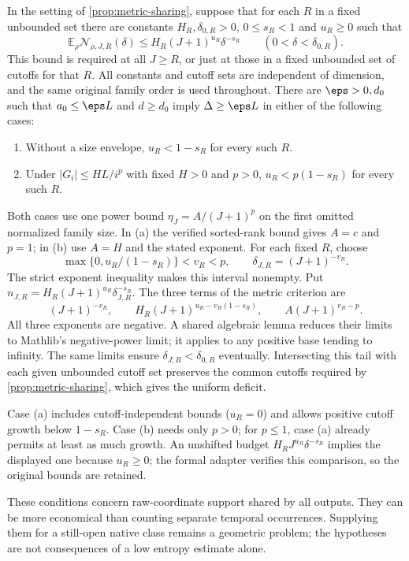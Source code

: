 \begin{corollary}\label{cor:covering-exponents}
In the setting of \cref{prop:metric-sharing}, suppose that for each $R$
in a fixed unbounded set there are constants $H_R,\delta_{0,R}>0$,
$0\le s_R<1$ and $u_R\ge0$ such that
\[
 \mathbb E_\rho\mathcal N_{\rho,J,R}(\delta)
 \le H_R(J+1)^{u_R}\delta^{-s_R}
 \qquad(0<\delta<\delta_{0,R}).
\]
This bound is required at all $J\ge R$, or just at those in a fixed
unbounded set of cutoffs for that $R$. All constants and cutoff sets
are independent of dimension, and the same original family order is
used throughout. There are $\eps>0,d_0$ such that $a_0\le\eps L$ and
$d\ge d_0$ imply $\Delta\ge\eps L$ in either of the following cases:
\begin{enumerate}[label=(\alph*)]
\item Without a size envelope, $u_R<1-s_R$ for every such $R$.
\item Under $|G_i|\le HL/i^p$ with fixed $H>0$ and $p>0$,
$u_R<p(1-s_R)$ for every such $R$.
\end{enumerate}
\end{corollary}
\begin{outline}
Both cases use one power bound $\eta_J=A/(J+1)^p$ on the first omitted
normalized family size. In (a) the verified sorted-rank bound gives
$A=c$ and $p=1$; in (b) use $A=H$ and the stated exponent.
For each fixed $R$, choose
\[
 \max\{0,u_R/(1-s_R)\}<v_R<p,
 \qquad \delta_{J,R}=(J+1)^{-v_R}.
\]
The strict exponent inequality makes this interval nonempty. Put
$n_{J,R}=H_R(J+1)^{u_R}\delta_{J,R}^{-s_R}$. The three terms of the
metric criterion are
\[
 (J+1)^{-v_R},\qquad
 H_R(J+1)^{u_R-v_R(1-s_R)},\qquad
 A(J+1)^{v_R-p}.
\]
All three exponents are negative. A shared algebraic lemma reduces their
limits to Mathlib's negative-power limit; it applies to any positive base
tending to infinity. The same limits ensure
$\delta_{J,R}<\delta_{0,R}$ eventually. Intersecting this tail with each
given unbounded cutoff set preserves the common cutoffs required by
\cref{prop:metric-sharing}, which gives the uniform deficit.
\end{outline}

Case (a) includes cutoff-independent bounds ($u_R=0$) and allows positive
cutoff growth below $1-s_R$. Case (b) needs only $p>0$; for $p\le1$,
case (a) already permits at least as much growth. An unshifted budget
$H_RJ^{u_R}\delta^{-s_R}$ implies the displayed one because $u_R\ge0$;
the formal adapter verifies this comparison, so the original bounds
are retained.

These conditions concern raw-coordinate support shared by all outputs.
They can be more economical than counting separate temporal occurrences.
Supplying them for a still-open native class remains a geometric problem;
the hypotheses are not consequences of a low entropy estimate alone.
